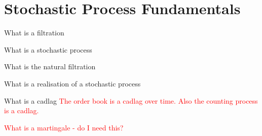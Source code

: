 \documentclass[honours,12pt]{unswthesis}
\numberwithin{equation}{section}
\begin{document}
\section{Stochastic Process Fundamentals}
What is a filtration

What is a stochastic process

What is the natural filtration

What is a realisation of a stochastic process

What is a cadlag \textcolor{red}{The order book is a cadlag over time. Also the counting process is a cadlag.}

\textcolor{red}{What is a martingale - do I need this?}





\clearpage
{}

\end{document}
